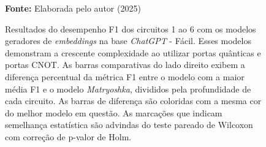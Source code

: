 \begin{figure}
\caption{Resultados do desempenho F1 dos circuitos 1 ao 6 com os modelos geradores de \textit{embeddings} na base \textit{ChatGPT} - Fácil. Esses modelos demonstram a crescente complexidade ao utilizar portas quânticas e portas CNOT. As barras comparativas do lado direito exibem a diferença percentual da métrica F1 entre o modelo com a maior média F1 e o modelo \textit{Matryoshka}, divididos pela profundidade de cada circuito. As barras de diferença são coloridas com a mesma cor do melhor modelo em questão. As marcações que indicam semelhança estatística são advindas do teste pareado de Wilcoxon com correção de p-valor de Holm.}
\label{fig:model_transformer:easy:g1}
     \centering
    \centering

      \par\medskip\ABNTEXfontereduzida\selectfont\textbf{Fonte:} Elaborada pelo autor (2025) \par\medskip
\end{figure}